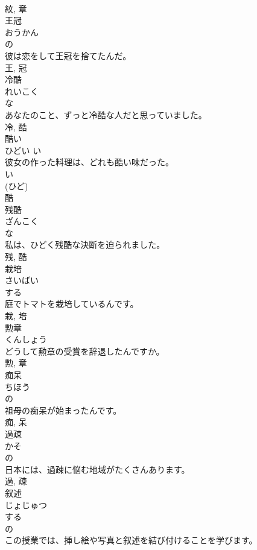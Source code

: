 \documentclass[8pt]{extreport}
\begin{document}
\begin{CJK}{UTF8}{min}
\\	紋, 章	
\\	王冠	
\\	おうかん	
\\	の 
\\	彼は恋をして王冠を捨てたんだ。	
\\	王, 冠	
\\	冷酷	
\\	れいこく	
\\	な 
\\	あなたのこと、ずっと冷酷な人だと思っていました。	
\\	冷, 酷	
\\	酷い	
\\	ひどい	い 
\\	彼女の作った料理は、どれも酷い味だった。	
\\	い 
\\	(ひど) 
\\	酷	
\\	残酷	
\\	ざんこく	
\\	な 
\\	私は、ひどく残酷な決断を迫られました。	
\\	残, 酷	
\\	栽培	
\\	さいばい	
\\	する 
\\	庭でトマトを栽培しているんです。	
\\	栽, 培	
\\	勲章	
\\	くんしょう	
\\	どうして勲章の受賞を辞退したんですか。	
\\	勲, 章	
\\	痴呆	
\\	ちほう	
\\	の 
\\	祖母の痴呆が始まったんです。	
\\	痴, 呆	
\\	過疎	
\\	かそ	
\\	の 
\\	日本には、過疎に悩む地域がたくさんあります。	
\\	過, 疎	
\\	叙述	
\\	じょじゅつ	
\\	する 
\\	の 
\\	この授業では、挿し絵や写真と叙述を結び付けることを学びます。	

\end{CJK}
\end{document}
